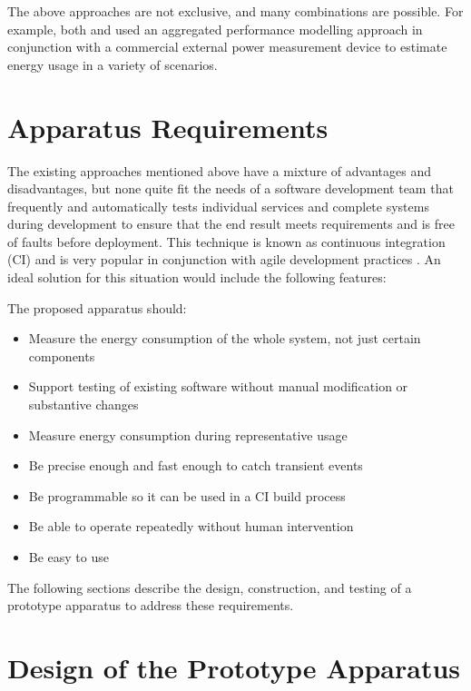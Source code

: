 The above approaches are not exclusive, and many combinations are possible. For example, both \citet{Kaup2014} and \citet{Stoico2023} used an aggregated performance modelling approach in conjunction with a commercial external power measurement device to estimate energy usage in a variety of scenarios.

\section{Apparatus Requirements}
\label{testrig:requirements}

The existing approaches mentioned above have a mixture of advantages and disadvantages, but none quite fit the needs of a software development team that frequently and automatically tests individual services and complete systems during development to ensure that the end result meets requirements and is free of faults before deployment. This technique is known as \gls{continuous integration} (CI) \citep{Meyer2014} and is very popular in conjunction with agile development practices \citep{Shahin2017}. An ideal solution for this situation would include the following features:

The proposed apparatus should:

\begin{itemize}
\item Measure the energy consumption of the whole system, not just certain components
\item Support testing of existing software without manual modification or substantive changes
\item Measure energy consumption during representative usage
\item Be precise enough and fast enough to catch transient events
\item Be programmable so it can be used in a CI build process
\item Be able to operate repeatedly without human intervention
\item Be easy to use
\end{itemize}

The following sections describe the design, construction, and testing of a prototype apparatus to address these requirements.

\section{Design of the Prototype Apparatus}
\label{testrig:design}

